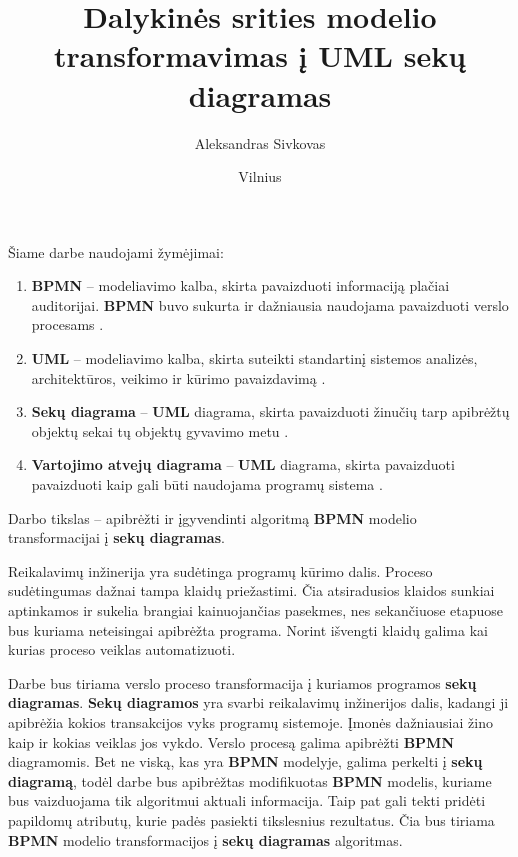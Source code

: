 \documentclass{VUMIFInfBakalaurinis}
\title{Dalykinės srities modelio transformavimas į UML sekų diagramas}
\author{Aleksandras Sivkovas}
\date{Vilnius \\ \the\year}
\begin{document}
\maketitle

\tableofcontents

Šiame darbe naudojami žymėjimai:
\begin{enumerate}
	\item \textbf{BPMN} – modeliavimo kalba, skirta pavaizduoti informaciją plačiai auditorijai. \textbf{BPMN} buvo sukurta ir dažniausia naudojama pavaizduoti verslo procesams \cite{bpmnFormal}.
	\item \textbf{UML} – modeliavimo kalba, skirta suteikti standartinį sistemos analizės, architektūros, veikimo ir kūrimo pavaizdavimą \cite{omgUmlFormal}.
	\item \textbf{Sekų diagrama} – \textbf{UML} diagrama, skirta pavaizduoti žinučių tarp apibrėžtų objektų sekai tų objektų gyvavimo metu \cite{omgUmlFormal}.
	\item \textbf{Vartojimo atvejų diagrama} – \textbf{UML} diagrama, skirta pavaizduoti pavaizduoti kaip gali būti naudojama programų sistema \cite{algUseCasesFromBpmn}.
\end{enumerate}


Darbo tikslas – apibrėžti ir įgyvendinti algoritmą \textbf{BPMN} modelio transformacijai į \textbf{sekų diagramas}.

Reikalavimų inžinerija yra sudėtinga programų kūrimo dalis. Proceso sudėtingumas dažnai tampa klaidų priežastimi. Čia atsiradusios klaidos sunkiai aptinkamos ir sukelia brangiai kainuojančias pasekmes, nes sekančiuose etapuose bus kuriama neteisingai apibrėžta programa. Norint išvengti klaidų galima kai kurias proceso veiklas automatizuoti.

Darbe bus tiriama verslo proceso transformacija į kuriamos programos \textbf{sekų diagramas}. \textbf{Sekų diagramos} yra svarbi reikalavimų inžinerijos dalis, kadangi ji apibrėžia kokios transakcijos vyks programų sistemoje. Įmonės dažniausiai žino kaip ir kokias veiklas jos vykdo. Verslo procesą galima apibrėžti \textbf{BPMN} diagramomis. Bet ne viską, kas yra \textbf{BPMN} modelyje, galima perkelti į \textbf{sekų diagramą}, todėl darbe bus apibrėžtas modifikuotas \textbf{BPMN} modelis, kuriame bus vaizduojama tik algoritmui aktuali informacija. Taip pat gali tekti pridėti papildomų atributų, kurie padės pasiekti tikslesnius rezultatus. Čia bus tiriama \textbf{BPMN} modelio transformacijos į \textbf{sekų diagramas} algoritmas.
\end{document}
